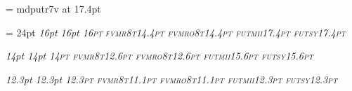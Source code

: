 \def\ttfontprefix{fvm}

\def\ttshape{r8t}
\def\ttbshape{b8t}
\def\ttslshape{ro8t}
\def\ttbslshape{bo8t}

\def\mtfontprefix{fut}

\def\mtitshape{mii}			%
\def\mtsyshape{sy}			%
\font\elevenex=  mdputr7v at 17.4pt 	%

\ifx\bigger\relax
  \def\textfontsize{17.4pt}
  \setfont\textrm\rmfontprefix\rmshape{\textfontsize}
\else
  \def\textfontsize{16pt}
  \textleading = 24pt %
  \setfont\textrm\rmfontprefix\rmshape{\textfontsize}
\fi
\setfont\textbf\rmfontprefix\bfshape{\textfontsize}
\setfont\textit\rmfontprefix\itshape{\textfontsize}
\setfont\textsl\rmfontprefix\slshape{\textfontsize}
\setfont\textsc\rmfontprefix\scshape{\textfontsize}
\setfont\texttt\ttfontprefix\ttshape{14.4pt}	%
\setfont\textttsl\ttfontprefix\ttslshape{14.4pt}	%
\setfont\texti\mtfontprefix\mtitshape{17.4pt}	%
\setfont\textsy\mtfontprefix\mtsyshape{17.4pt}	%

\setfont{}\rmfontprefix\bxshape{14.5pt} %
\def\df{\let\tentt=\deftt \let\tenbf = \defbf \bf}

\def\smallfontsize{14pt}		%
\setfont\smallrm\rmfontprefix\rmshape{\smallfontsize}
\setfont\smallbf\rmfontprefix\bfshape{\smallfontsize}
\setfont\smallit\rmfontprefix\itshape{\smallfontsize}
\setfont\smallsl\rmfontprefix\slshape{\smallfontsize}
\setfont\smallsc\rmfontprefix\scshape{\smallfontsize}
\setfont\smalltt\ttfontprefix\ttshape{12.6pt}
\setfont\smallttsl\ttfontprefix\ttslshape{12.6pt}
\setfont\smalli\mtfontprefix\mtitshape{15.6pt}
\setfont\smallsy\mtfontprefix\mtsyshape{15.6pt}

\def\smallerfontsize{12.3pt}		%
\setfont\smallerrm\rmfontprefix\rmshape{\smallerfontsize}
\setfont\smallerbf\rmfontprefix\bfshape{\smallerfontsize}
\setfont\smallerit\rmfontprefix\itshape{\smallerfontsize}
\setfont\smallersl\rmfontprefix\slshape{\smallerfontsize}
\setfont\smallersc\rmfontprefix\scshape{\smallerfontsize}
\setfont\smallertt\ttfontprefix\ttshape{11.1pt}
\setfont\smallerttsl\ttfontprefix\ttslshape{11.1pt}
\setfont\smalleri\mtfontprefix\mtitshape{\smallerfontsize}
\setfont\smallersy\mtfontprefix\mtsyshape{\smallerfontsize}

